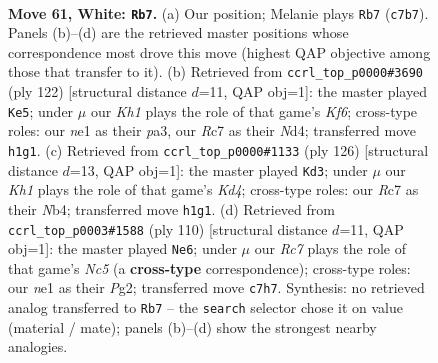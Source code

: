\documentclass[11pt]{article}
\begin{document}
\clearpage

\begin{figure}[p]\centering
\begin{subfigure}{0.46\textwidth}\centering
\resizebox{\linewidth}{!}{%
\newchessgame
\chessboard[
  setfen={1N6/2R5/3p1k2/8/6pp/8/1p6/4n2K w - - 0 61},
  showmover=false,
  pgfstyle=straightmove, color=movearrow, markmove={c7-b7}
]}
\caption{}
\end{subfigure}\hfill
\begin{subfigure}{0.46\textwidth}\centering
\resizebox{\linewidth}{!}{%
\newchessgame
\chessboard[
  setfen={8/1pp5/5K2/8/2PN2k1/p7/8/8 w - - 2 62},
  showmover=false,
  pgfstyle=straightmove, color=movearrow, markmove={f6-e5}
]}
\caption{}
\end{subfigure}
\\[4pt]
\begin{subfigure}{0.46\textwidth}\centering
\resizebox{\linewidth}{!}{%
\newchessgame
\chessboard[
  setfen={8/1k5p/8/8/PN1K2p1/6P1/8/1n6 w - - 0 64},
  showmover=false,
  pgfstyle=straightmove, color=movearrow, markmove={d4-d3}
]}
\caption{}
\end{subfigure}\hfill
\begin{subfigure}{0.46\textwidth}\centering
\resizebox{\linewidth}{!}{%
\newchessgame
\chessboard[
  setfen={8/6p1/8/p1N4p/8/4k3/6PP/1K6 w - - 1 56},
  showmover=false,
  pgfstyle=straightmove, color=movearrow, markmove={c5-e6}
]}
\caption{}
\end{subfigure}
\caption{\textbf{Move 61, White: \texttt{Rb7}.} (a) Our position; Melanie plays \texttt{Rb7} (\texttt{c7b7}). Panels (b)--(d) are the retrieved master positions whose correspondence most drove this move (highest QAP objective among those that transfer to it). (b) Retrieved from \texttt{ccrl\_top\_p0000\#3690} (ply 122) [structural distance $d$=11, QAP obj=1]: the master played \texttt{Ke5}; under $\mu$ our \emph{Kh1} plays the role of that game's \emph{Kf6}; cross-type roles: our \emph{n}e1 as their \emph{p}a3, our \emph{R}c7 as their \emph{N}d4; transferred move \texttt{h1g1}. (c) Retrieved from \texttt{ccrl\_top\_p0000\#1133} (ply 126) [structural distance $d$=13, QAP obj=1]: the master played \texttt{Kd3}; under $\mu$ our \emph{Kh1} plays the role of that game's \emph{Kd4}; cross-type roles: our \emph{R}c7 as their \emph{N}b4; transferred move \texttt{h1g1}. (d) Retrieved from \texttt{ccrl\_top\_p0003\#1588} (ply 110) [structural distance $d$=11, QAP obj=1]: the master played \texttt{Ne6}; under $\mu$ our \emph{Rc7} plays the role of that game's \emph{Nc5} (a \textbf{cross-type} correspondence); cross-type roles: our \emph{n}e1 as their \emph{P}g2; transferred move \texttt{c7h7}. Synthesis: no retrieved analog transferred to \texttt{Rb7} -- the \texttt{search} selector chose it on value (material / mate); panels (b)--(d) show the strongest nearby analogies.}
\label{fig:thought-m120}
\end{figure}
\end{document}
